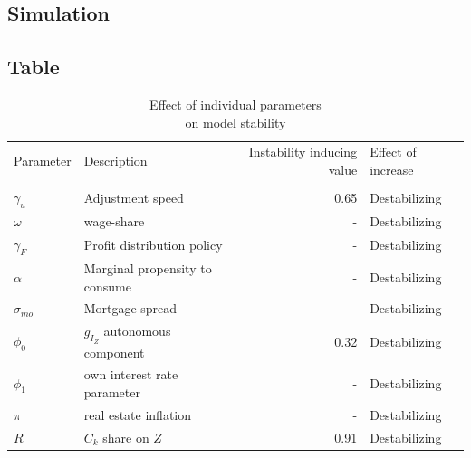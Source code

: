 \documentclass[11pt]{article}
\begin{document}
\subsection{Simulation}
\label{sec:org2b91c3e}

\subsection{Table}
\label{sec:orge6bf765}


\begin{table}
\centering
\caption{Effect of individual parameters\\on model stability}
\label{tab:sensibility}
\begin{tabular}{llrl}
\toprule
Parameter &                     Description &  Instability inducing value & Effect of increase \\
              &                                 &                             &                    \\
\midrule
$\gamma_u$    &                Adjustment speed &                        0.65 &      Destabilizing \\
$\omega$      &                      wage-share &                           - &      Destabilizing \\
$\gamma_F$    &      Profit distribution policy &                           - &      Destabilizing \\
$\alpha$      &  Marginal propensity to consume &                           - &      Destabilizing \\
$\sigma_{mo}$ &                 Mortgage spread &                           - &      Destabilizing \\
$\phi_0$      &  $g_{I_Z}$ autonomous component &                        0.32 &      Destabilizing \\
$\phi_1$      &     own interest rate parameter &                           - &      Destabilizing \\
$\pi$         &           real estate inflation &                           - &      Destabilizing \\
$R$           &              $C_k$ share on $Z$ &                        0.91 &      Destabilizing \\
\bottomrule
\end{tabular}
\end{table}
\end{document}

